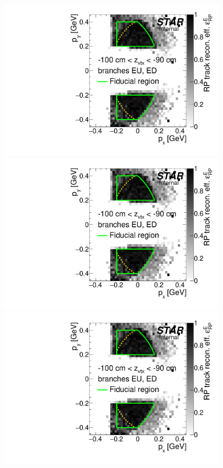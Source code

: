 \begin{figure}[hb]\ContinuedFloat
\centering
\parbox{0.495\textwidth}{
  \centering
  \includegraphics[width=\linewidth,page=9]{graphics/corrections/mcEffPxPy.pdf}\\
  \includegraphics[width=\linewidth,page=11]{graphics/corrections/mcEffPxPy.pdf}\\
  \includegraphics[width=\linewidth,page=13]{graphics/corrections/mcEffPxPy.pdf}
}
\end{figure}
